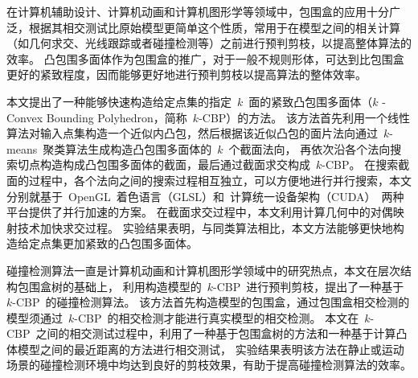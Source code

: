 \begin{cabstract}
  
在计算机辅助设计、计算机动画和计算机图形学等领域中，包围盒的应用十分广泛，根据其相交测试比原始模型更简单这个性质，常用于在模型之间的相关计算（如几何求交、光线跟踪或者碰撞检测等）之前进行预判剪枝，以提高整体算法的效率。
凸包围多面体作为包围盒的推广，对于一般不规则形体，可达到比包围盒更好的紧致程度，因而能够更好地进行预判剪枝以提高算法的整体效率。

本文提出了一种能够快速构造给定点集的指定~$k$~面的紧致凸包围多面体（$k$ - Convex Bounding Polyhedron，简称~$k$-CBP）的方法。
该方法首先利用一个线性算法对输入点集构造一个近似内凸包，然后根据该近似凸包的面片法向通过~$k$-means~聚类算法生成构造凸包围多面体的~$k$~个截面法向，
再依次沿各个法向搜索切点构造构成凸包围多面体的截面，最后通过截面求交构成~$k$-CBP。 
在搜索截面的过程中，各个法向之间的搜索过程相互独立，可以方便地进行并行搜索，本文分别就基于~OpenGL~着色语言（GLSL）和~计算统一设备架构（CUDA）~两种平台提供了并行加速的方案。
在截面求交过程中，本文利用计算几何中的对偶映射技术加快求交过程。
实验结果表明，与同类算法相比，本文方法能够更快地构造给定点集更加紧致的凸包围多面体。

碰撞检测算法一直是计算机动画和计算机图形学领域中的研究热点，本文在层次结构包围盒树的基础上，
利用构造模型的~$k$-CBP~进行预判剪枝，提出了一种基于~$k$-CBP~的碰撞检测算法。
该方法首先构造模型的包围盒，通过包围盒相交检测的模型须通过~$k$-CBP~的相交检测才能进行真实模型的相交检测。
本文在~$k$-CBP~之间的相交测试过程中，利用了一种基于包围盒树的方法和一种基于计算凸体模型之间的最近距离的方法进行相交测试，
实验结果表明该方法在静止或运动场景的碰撞检测环境中均达到良好的剪枝效果，有助于提高碰撞检测算法的效率。



\end{cabstract}


